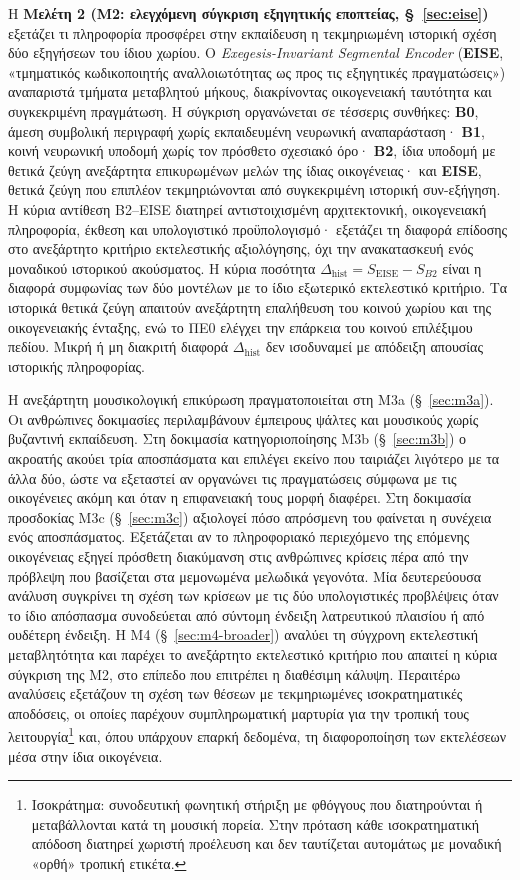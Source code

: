 \documentclass[11pt,a4paper]{article}
\begin{document}
Η \textbf{Μελέτη 2 (M2: ελεγχόμενη σύγκριση εξηγητικής εποπτείας, §~\ref{sec:eise})} εξετάζει τι πληροφορία προσφέρει στην εκπαίδευση η τεκμηριωμένη ιστορική σχέση δύο εξηγήσεων του ίδιου χωρίου. Ο \emph{Exegesis-Invariant Segmental Encoder} (\textbf{EISE}, «τμηματικός κωδικοποιητής αναλλοιωτότητας ως προς τις εξηγητικές πραγματώσεις») αναπαριστά τμήματα μεταβλητού μήκους, διακρίνοντας οικογενειακή ταυτότητα και συγκεκριμένη πραγμάτωση. Η σύγκριση οργανώνεται σε τέσσερις συνθήκες: \textbf{B0}, άμεση συμβολική περιγραφή χωρίς εκπαιδευμένη νευρωνική αναπαράσταση· \textbf{B1}, κοινή νευρωνική υποδομή χωρίς τον πρόσθετο σχεσιακό όρο· \textbf{B2}, ίδια υποδομή με θετικά ζεύγη ανεξάρτητα επικυρωμένων μελών της ίδιας οικογένειας· και \textbf{EISE}, θετικά ζεύγη που επιπλέον τεκμηριώνονται από συγκεκριμένη ιστορική συν-εξήγηση. Η κύρια αντίθεση B2--EISE διατηρεί αντιστοιχισμένη αρχιτεκτονική, οικογενειακή πληροφορία, έκθεση και υπολογιστικό προϋπολογισμό· εξετάζει τη διαφορά επίδοσης στο ανεξάρτητο κριτήριο εκτελεστικής αξιολόγησης, όχι την ανακατασκευή ενός μοναδικού ιστορικού ακούσματος. Η κύρια ποσότητα $\Delta_{\mathrm{hist}}=S_{\mathrm{EISE}}-S_{B2}$ είναι η διαφορά συμφωνίας των δύο μοντέλων με το ίδιο εξωτερικό εκτελεστικό κριτήριο. Τα ιστορικά θετικά ζεύγη απαιτούν ανεξάρτητη επαλήθευση του κοινού χωρίου και της οικογενειακής ένταξης, ενώ το ΠΕ0 ελέγχει την επάρκεια του κοινού επιλέξιμου πεδίου. Μικρή ή μη διακριτή διαφορά $\Delta_{\mathrm{hist}}$ δεν ισοδυναμεί με απόδειξη απουσίας ιστορικής πληροφορίας.

Η ανεξάρτητη μουσικολογική επικύρωση πραγματοποιείται στη M3a (§~\ref{sec:m3a}). Οι ανθρώπινες δοκιμασίες περιλαμβάνουν έμπειρους ψάλτες και μουσικούς χωρίς βυζαντινή εκπαίδευση. Στη δοκιμασία κατηγοριοποίησης M3b (§~\ref{sec:m3b}) ο ακροατής ακούει τρία αποσπάσματα και επιλέγει εκείνο που ταιριάζει λιγότερο με τα άλλα δύο, ώστε να εξεταστεί αν οργανώνει τις πραγματώσεις σύμφωνα με τις οικογένειες ακόμη και όταν η επιφανειακή τους μορφή διαφέρει. Στη δοκιμασία προσδοκίας M3c (§~\ref{sec:m3c}) αξιολογεί πόσο απρόσμενη του φαίνεται η συνέχεια ενός αποσπάσματος. Εξετάζεται αν το πληροφοριακό περιεχόμενο της επόμενης οικογένειας εξηγεί πρόσθετη διακύμανση στις ανθρώπινες κρίσεις πέρα από την πρόβλεψη που βασίζεται στα μεμονωμένα μελωδικά γεγονότα. Μία δευτερεύουσα ανάλυση συγκρίνει τη σχέση των κρίσεων με τις δύο υπολογιστικές προβλέψεις όταν το ίδιο απόσπασμα συνοδεύεται από σύντομη ένδειξη λατρευτικού πλαισίου ή από ουδέτερη ένδειξη. Η M4 (§~\ref{sec:m4-broader}) αναλύει τη σύγχρονη εκτελεστική μεταβλητότητα και παρέχει το ανεξάρτητο εκτελεστικό κριτήριο που απαιτεί η κύρια σύγκριση της M2, στο επίπεδο που επιτρέπει η διαθέσιμη κάλυψη. Περαιτέρω αναλύσεις εξετάζουν τη σχέση των θέσεων με τεκμηριωμένες ισοκρατηματικές αποδόσεις, οι οποίες παρέχουν συμπληρωματική μαρτυρία για την τροπική τους λειτουργία\footnote{Ισοκράτημα: συνοδευτική φωνητική στήριξη με φθόγγους που διατηρούνται ή μεταβάλλονται κατά τη μουσική πορεία. Στην πρόταση κάθε ισοκρατηματική απόδοση διατηρεί χωριστή προέλευση και δεν ταυτίζεται αυτομάτως με μοναδική «ορθή» τροπική ετικέτα.} και, όπου υπάρχουν επαρκή δεδομένα, τη διαφοροποίηση των εκτελέσεων μέσα στην ίδια οικογένεια.
\end{document}
